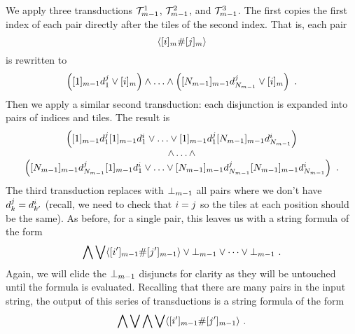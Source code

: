 We apply three transductions $\psst^1_{\expheight-1}$,
$\psst^2_{\expheight-1}$, and $\psst^3_{\expheight-1}$. The first copies
the first index of each pair directly after the tiles of the second
index. That is, each pair
\[
    \lmark \tenc{\expheight}{\idxi} \spacer \tenc{\expheight}{\idxj} \rmark
\]
is rewritten to
\[
    \brac{
        \tenc{\expheight-1}{1} \vartile^\idxj_1
        \lor
        \tenc{\expheight}{\idxi}
    }
    \land
    \ldots
    \land
    \brac{
        \tenc{\expheight-1}{\nmax{\expheight-1}}
            \vartile^\idxj_{\nmax{\expheight-1}}
        \lor
        \tenc{\expheight}{\idxi}
    } \ .
\]
Then we apply a similar second transduction: each disjunction is
expanded into pairs of indices and tiles. The result is
\[
    \begin{array}{c}
        \brac{
            \tenc{\expheight-1}{1} \vartile^\idxj_1
            \tenc{\expheight-1}{1} \vartile^\idxi_1
            \lor
            \ldots
            \lor
            \tenc{\expheight-1}{1} \vartile^\idxj_1
            \tenc{\expheight-1}{\nmax{\expheight-1}}
                \vartile^\idxi_{\nmax{\expheight-1}}
        } \\
        \land
        \ldots
        \land \\
        \brac{
            \tenc{\expheight-1}{\nmax{\expheight-1}}
                \vartile^\idxj_{\nmax{\expheight-1}}
            \tenc{\expheight-1}{1} \vartile^\idxi_1
            \lor
            \ldots
            \lor
            \tenc{\expheight-1}{\nmax{\expheight-1}}
                \vartile^\idxj_{\nmax{\expheight-1}}
            \tenc{\expheight-1}{\nmax{\expheight-1}}
                \vartile^\idxi_{\nmax{\expheight-1}}
        } \ .
    \end{array}
\]
The third transduction replaces with $\sffalse{\expheight-1}$ all pairs where
we don't have $\vartile^\idxj_\idxk = \vartile^\idxi_{\idxk'}$ (recall, we need
to check that $\idxi = \idxj$ so the tiles at each position should be the
same). As before, for a single pair, this leaves us with a string formula of
the form
\[
    \bigwedge \bigvee \lmark
        \tenc{\expheight-1}{\idxi'} \spacer \tenc{\expheight-1}{\idxj'}
    \rmark
    \lor \sffalse{\expheight-1} \lor \cdots \lor \sffalse{\expheight-1} \ .
\]
Again, we will elide the $\sffalse{\expheight-1}$ disjuncts for clarity as they
will be untouched until the formula is evaluated.  Recalling that there are
many pairs in the input string, the output of this series of transductions is a
string formula of the form
\[
    \bigwedge \bigvee \bigwedge \bigvee \lmark
        \tenc{\expheight-1}{\idxi'} \spacer \tenc{\expheight-1}{\idxj'}
    \rmark \ .
\]

